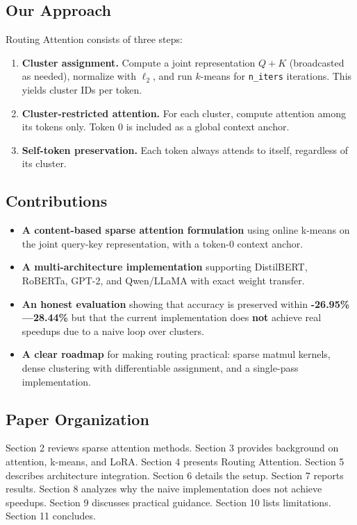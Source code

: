 \subsection{Our Approach}

Routing Attention consists of three steps:

\begin{enumerate}
\item \textbf{Cluster assignment.} Compute a joint representation $Q + K$
  (broadcasted as needed), normalize with $\ell_2$, and run $k$-means for
  \texttt{n\_iters} iterations. This yields cluster IDs per token.

\item \textbf{Cluster-restricted attention.} For each cluster, compute attention
  among its tokens only. Token 0 is included as a global context anchor.

\item \textbf{Self-token preservation.} Each token always attends to itself,
  regardless of its cluster.

\end{enumerate}
\subsection{Contributions}

\begin{itemize}
\item \textbf{A content-based sparse attention formulation} using online k-means on
  the joint query-key representation, with a token-0 context anchor.
\item \textbf{A multi-architecture implementation} supporting DistilBERT, RoBERTa,
  GPT-2, and Qwen/LLaMA with exact weight transfer.
\item \textbf{An honest evaluation} showing that accuracy is preserved within
  \textbf{-26.95\%---28.44\%} but that the current implementation does
  \textbf{not} achieve real speedups due to a naive loop over clusters.
\item \textbf{A clear roadmap} for making routing practical: sparse matmul kernels,
  dense clustering with differentiable assignment, and a single-pass
  implementation.

\end{itemize}
\subsection{Paper Organization}

Section 2 reviews sparse attention methods. Section 3 provides background 
on attention, k-means, and LoRA. Section 4 presents Routing Attention. 
Section 5 describes architecture integration. Section 6 details the setup. 
Section 7 reports results. Section 8 analyzes why the naive implementation 
does not achieve speedups. Section 9 discusses practical guidance. Section 
10 lists limitations. Section 11 concludes.



